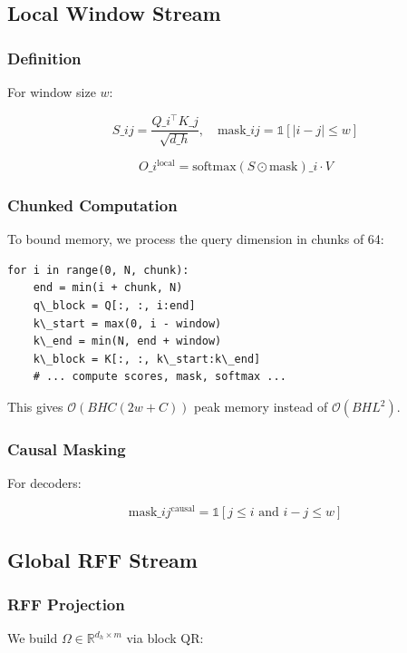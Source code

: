 \subsection{Local Window Stream}

\subsubsection{Definition}

For window size $w$:

\[
S\_{ij} = \frac{Q\_i^\top K\_j}{\sqrt{d\_h}}, \quad
\text{mask}\_{ij} = \mathbb{1}[|i - j| \leq w]
\tag{4.1}
\]

\[
O\_i^\text{local} = \text{softmax}(S \odot \text{mask})\_i \cdot V
\tag{4.2}
\]

\subsubsection{Chunked Computation}

To bound memory, we process the query dimension in chunks of 64:

\begin{lstlisting}
for i in range(0, N, chunk):
    end = min(i + chunk, N)
    q\_block = Q[:, :, i:end]
    k\_start = max(0, i - window)
    k\_end = min(N, end + window)
    k\_block = K[:, :, k\_start:k\_end]
    # ... compute scores, mask, softmax ...
\end{lstlisting}

This gives $\mathcal{O}(B H C (2w + C))$ peak memory instead of 
$\mathcal{O}(B H L^2)$.

\subsubsection{Causal Masking}

For decoders:

\[
\text{mask}\_{ij}^\text{causal} = \mathbb{1}[j \leq i \text{ and } i - j \leq w]
\tag{4.3}
\]

\subsection{Global RFF Stream}

\subsubsection{RFF Projection}

We build $\Omega \in \mathbb{R}^{d_h \times m}$ via block QR:

